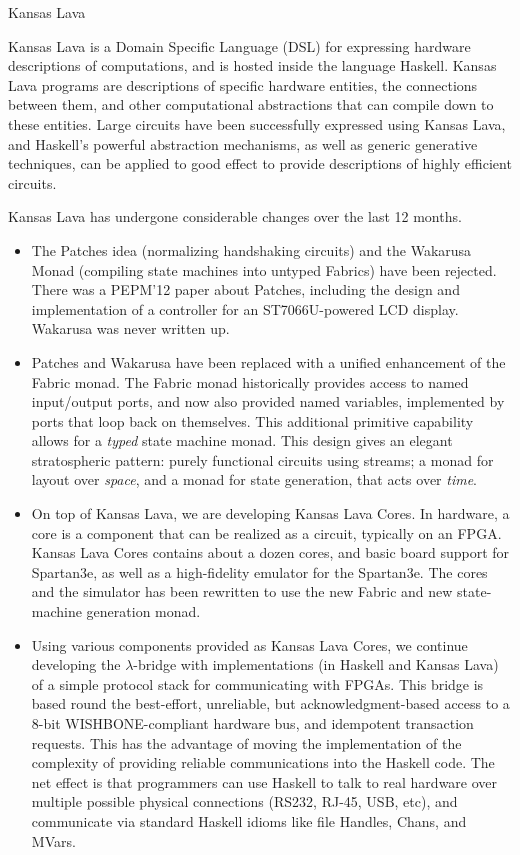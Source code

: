 \begin{hcarentry}{Kansas Lava}
\label{klava}
\makeheader

Kansas Lava is a Domain Specific Language (DSL) for expressing
hardware descriptions of computations, and is hosted inside the
language Haskell. Kansas Lava programs are descriptions of specific hardware
entities, the connections between them, and other computational abstractions
that can compile down to these entities. Large circuits have been successfully
expressed using Kansas Lava, and Haskell's powerful abstraction mechanisms, as
well as generic generative techniques, can be applied to good effect to provide
descriptions of highly efficient circuits.

Kansas Lava has undergone considerable changes over the last 12 months.
\begin{itemize}
\item The Patches idea (normalizing handshaking circuits) and the Wakarusa
Monad (compiling state machines into untyped Fabrics) have been rejected. There
was a PEPM'12 paper about Patches,
including the design and implementation of a controller for an ST7066U-powered
LCD display.
Wakarusa was never written up.

\item Patches and Wakarusa have been replaced with a unified enhancement of the Fabric
monad. The Fabric monad historically provides access to named input/output ports,
and now also provided named variables, implemented by ports that loop back on
themselves. This additional primitive capability allows for a {\em typed\/}
state machine monad.
This design gives an elegant stratospheric pattern: purely functional circuits using streams;
a monad for layout over {\em space\/}, and a monad for state generation,
that acts over {\em time\/}.

\item 
On top of Kansas Lava, we are developing Kansas Lava Cores.
In hardware, a core is a component
that can be realized as a circuit, typically on an FPGA. Kansas Lava Cores
contains about a dozen cores, and basic board support for Spartan3e,
as well as a high-fidelity emulator for the Spartan3e. The
cores and the simulator has been rewritten to use the new Fabric
and new state-machine generation monad.

\item Using various components provided as Kansas Lava Cores, 
we continue developing the $\lambda$-bridge 
with implementations (in Haskell and
Kansas Lava) of a simple protocol stack for communicating with FPGAs.
This bridge is based round the best-effort, unreliable,
but acknowledgment-based access to a 8-bit WISHBONE-compliant hardware bus,
and idempotent transaction requests.
This has the advantage of moving the implementation
of the complexity of providing reliable communications into the Haskell
code. The net effect is that programmers can use Haskell to
talk to real hardware over multiple possible physical connections
(RS232, RJ-45, USB, etc), and communicate via standard Haskell
idioms like file Handles, Chans, and MVars.


\end{itemize}
\end{hcarentry}
